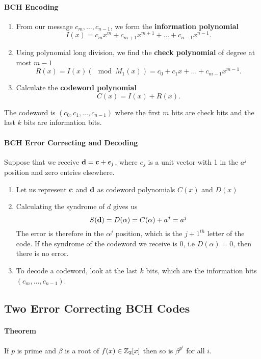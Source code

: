 \paragraph{BCH Encoding}
\begin{enumerate}
    \item From our message \(c_m, \dots, c_{n - 1}\), we form the \textbf{information polynomial}
          \[I(x) = c_m x^m + c_{m + 1}x^{m + 1} + \dots + c_{n - 1}x^{n - 1}.\]
    \item Using polynomial long division, we find the \textbf{check polynomial} of degree at most \(m - 1\)
          \[R(x) = I(x)(\mod M_1(x)) = c_0 + c_1 x + \dots + c_{m - 1}x^{m - 1}.\]
    \item Calculate the \textbf{codeword polynomial}
          \[C(x) = I(x) + R(x).\]
\end{enumerate}
The codeword is \((c_0, c_1, \dots, c_{n - 1})\) where the first \(m\) bits are check bits and the last \(k\) bits are information bits.

\paragraph{BCH Error Correcting and Decoding}
Suppose that we receive \(\mathbf{d} = \mathbf{c} + e_j\), where \(e_j\) is a unit vector with 1 in the \(a^j\) position and zero entries elsewhere.
\begin{enumerate}
    \item Let us represent \(\mathbf{c}\) and \(\bf d\) as codeword polynomials \(C(x)\) and \(D(x)\)
    \item Calculating the syndrome of \(d\) gives us
          \[S({\bf d}) = D(\alpha) = C(\alpha) + a^j = a^j\]
          The error is therefore in the \(\alpha^j\) position, which is the \(j + 1^{th}\) letter of the code. If the syndrome of the codeword we receive is 0, i.e \(D(\alpha) = 0\), then there is no error.
    \item To decode a codeword, look at the last \(k\) bits, which are the information bits \((c_m, \dots, c_{n - 1})\).
\end{enumerate}

\subsection{Two Error Correcting BCH Codes}
\paragraph{Theorem} If \(p\) is prime and \(\beta\) is a root of \(f(x) \in \mathbb{Z}_2[x]\) then so is \(\beta^{p^i}\) for all \(i\).

